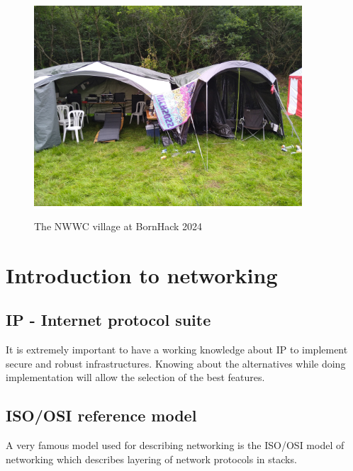 \documentclass[a4paper,11pt,notitlepage]{report}
\begin{document}
\begin{figure}[H]
\label{fig:osi}
\begin{center}
\colorbox{white}{\includegraphics[width=10cm]{images/bornhack-camp-2024.jpg}}
\end{center}
\caption{The NWWC village at BornHack 2024}
\end{figure}


\eject

\rhead{\fancyplain{}{\bf \chaptername\ \thechapter}}



\chapter*{\color{titlecolor}Introduction to networking}
\label{chap:intro}

\section*{\color{titlecolor}IP - Internet protocol suite}

It is extremely important to have a working knowledge about IP to implement
secure and robust infrastructures. Knowing about the alternatives while doing
implementation will allow the selection of the best features.

\section*{\color{titlecolor}ISO/OSI reference model}
A very famous model used for describing networking is the ISO/OSI model
of networking which describes layering of network protocols in stacks.
\end{document}
